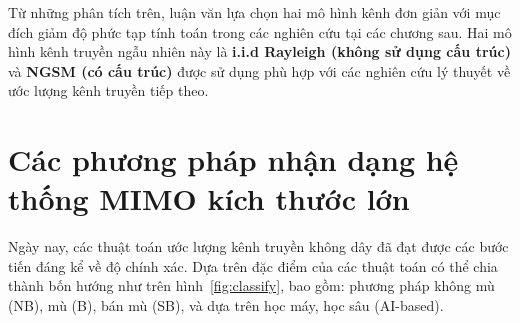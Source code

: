 Từ những phân tích trên, luận văn lựa chọn hai mô hình kênh đơn giản với mục đích giảm độ phức tạp tính toán trong các nghiên cứu tại các chương sau. Hai mô hình kênh truyền ngẫu nhiên này là \textbf{i.i.d Rayleigh (không sử dụng cấu trúc)} và \textbf{NGSM (có cấu trúc)} được sử dụng phù hợp với các nghiên cứu lý thuyết về ước lượng kênh truyền tiếp theo.

\section{Các phương pháp nhận dạng hệ thống MIMO kích thước lớn}

Ngày nay, các thuật toán ước lượng kênh truyền không dây đã đạt được các bước tiến đáng kể về độ chính xác. Dựa trên đặc điểm của các thuật toán có thể chia thành bốn hướng như trên hình~\ref{fig:classify}, bao gồm: phương pháp không mù (NB), mù (B), bán mù (SB), và dựa trên học máy, học sâu (AI-based). 

